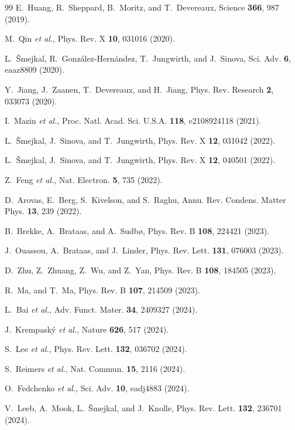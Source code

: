 \documentclass[aps,prb,reprint,superscriptaddress,amsmath,amssymb,floatfix]{revtex4-2}
\begin{document}
\begin{thebibliography}{99}
E.~Huang, R.~Sheppard, B.~Moritz, and T.~Devereaux,
Science \textbf{366}, 987 (2019).

M.~Qin \textit{et al.},
Phys. Rev. X \textbf{10}, 031016 (2020).

L.~Šmejkal, R.~González-Hernández, T.~Jungwirth, and J.~Sinova,
Sci. Adv. \textbf{6}, eaaz8809 (2020).

Y.~Jiang, J.~Zaanen, T.~Devereaux, and H.~Jiang,
Phys. Rev. Research \textbf{2}, 033073 (2020).

I.~Mazin \textit{et al.},
Proc. Natl. Acad. Sci. U.S.A. \textbf{118}, e2108924118 (2021).

L.~Šmejkal, J.~Sinova, and T.~Jungwirth,
Phys. Rev. X \textbf{12}, 031042 (2022).

L.~Šmejkal, J.~Sinova, and T.~Jungwirth,
Phys. Rev. X \textbf{12}, 040501 (2022).

Z.~Feng \textit{et al.},
Nat. Electron. \textbf{5}, 735 (2022).

D.~Arovas, E.~Berg, S.~Kivelson, and S.~Raghu,
Annu. Rev. Condens. Matter Phys. \textbf{13}, 239 (2022).

B.~Brekke, A.~Brataas, and A.~Sudbø,
Phys. Rev. B \textbf{108}, 224421 (2023).

J.~Ouassou, A.~Brataas, and J.~Linder,
Phys. Rev. Lett. \textbf{131}, 076003 (2023).

D.~Zhu, Z.~Zhuang, Z.~Wu, and Z.~Yan,
Phys. Rev. B \textbf{108}, 184505 (2023).

R.~Ma, and T.~Ma,
Phys. Rev. B \textbf{107}, 214509 (2023).

L.~Bai \textit{et al.},
Adv. Funct. Mater. \textbf{34}, 2409327 (2024).

J.~Krempaský \textit{et al.},
Nature \textbf{626}, 517 (2024).

S.~Lee \textit{et al.},
Phys. Rev. Lett. \textbf{132}, 036702 (2024).

S.~Reimers \textit{et al.},
Nat. Commun. \textbf{15}, 2116 (2024).

O.~Fedchenko \textit{et al.},
Sci. Adv. \textbf{10}, eadj4883 (2024).

V.~Leeb, A.~Mook, L.~Šmejkal, and J.~Knolle,
Phys. Rev. Lett. \textbf{132}, 236701 (2024).


\end{thebibliography}
\end{document}
